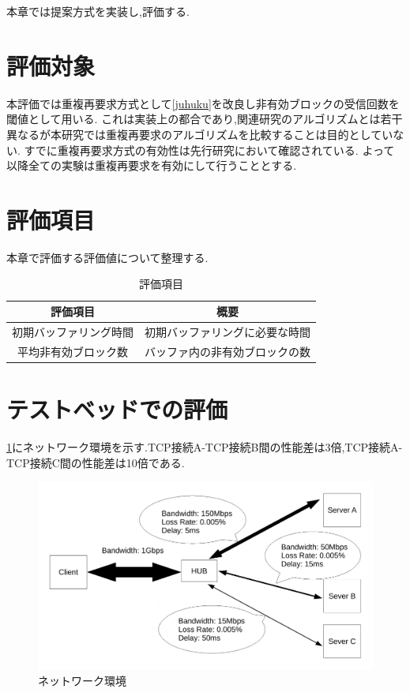 \documentclass[a4j,12pt]{gradthesis_utf8}
\begin{document}
本章では提案方式を実装し,評価する.

\section{評価対象}
本評価では重複再要求方式として\ref{juhuku}を改良し非有効ブロックの受信回数を閾値として用いる.
これは実装上の都合であり,関連研究のアルゴリズムとは若干異なるが本研究では重複再要求のアルゴリズムを比較することは目的としていない.
すでに重複再要求方式の有効性は先行研究において確認されている.
よって以降全ての実験は重複再要求を有効にして行うこととする.

\section{評価項目}
\label{hyoukakoumoku}
本章で評価する評価値について整理する.
\begin{table}[htb]
	\begin{center}
		\caption{評価項目}
		\begin{tabular}{|c|c|} \hline
			評価項目 & 概要　\\ \hline \hline
			初期バッファリング時間 & 初期バッファリングに必要な時間 \\ \hline
			平均非有効ブロック数 & バッファ内の非有効ブロックの数 \\ \hline
		\end{tabular}
	\end{center}
\end{table}

\newpage

\section{テストベッドでの評価}
\label{testbed}
\ref{networkmodel}にネットワーク環境を示す.TCP接続A-TCP接続B間の性能差は3倍,TCP接続A-TCP接続C間の性能差は10倍である.
\begin{figure}[h]
	\label{networkmodel}
	\begin{center}
		\includegraphics[width=16cm]{figure/test_network.pdf}
		\caption{ネットワーク環境}
	\end{center}
\end{figure}
\end{document}
